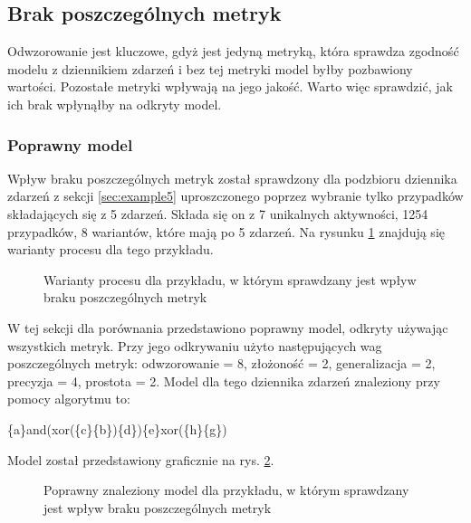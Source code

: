 \subsection{Brak poszczególnych metryk}
Odwzorowanie jest kluczowe, gdyż jest jedyną metryką, która sprawdza zgodność modelu z dziennikiem zdarzeń i bez tej metryki model byłby pozbawiony wartości. Pozostałe metryki wpływają na jego jakość. Warto więc sprawdzić, jak ich brak wpłynąłby na odkryty model.

\subsubsection{Poprawny model}
Wpływ braku poszczególnych metryk został sprawdzony dla podzbioru dziennika zdarzeń z sekcji \ref{sec:example5} uproszczonego poprzez wybranie tylko przypadków składających się z 5 zdarzeń. 
Składa się on z 7 unikalnych aktywności, 1254 przypadków, 8 wariantów, które mają po 5 zdarzeń. Na rysunku \ref{fig:p6_variants} znajdują się warianty procesu dla tego przykładu. 

\begin{figure}[!ht]
	\caption{\label{fig:p6_variants}Warianty procesu dla przykładu, w którym sprawdzany jest wpływ braku poszczególnych metryk}
\end{figure}

W tej sekcji dla porównania przedstawiono poprawny model, odkryty używając wszystkich metryk. Przy jego odkrywaniu użyto następujących wag poszczególnych metryk: odwzorowanie = 8, złożoność = 2, generalizacja = 2, precyzja = 4, prostota = 2. Model dla tego dziennika zdarzeń znaleziony przy pomocy algorytmu to:
\begin{center}
	\{a\}and(xor(\{c\}\{b\})\{d\})\{e\}xor(\{h\}\{g\})
\end{center}
Model został przedstawiony graficznie na rys. \ref{fig:p6_model}.

\begin{figure}[!ht]
	\caption{\label{fig:p6_model}Poprawny znaleziony model dla przykładu, w którym sprawdzany jest wpływ braku poszczególnych metryk}
\end{figure}

